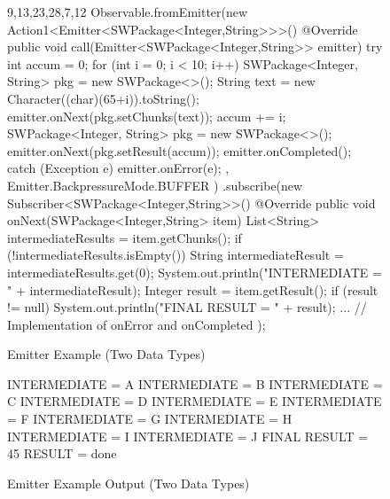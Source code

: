 \begin{figure}[H]
\begin{minipage}{0.65\textwidth}
\begin{sourcecode}
\begin{javacode}{9,13,23,28,7,12}
Observable.fromEmitter(new Action1<Emitter<SWPackage<Integer,String>>>() {
    @Override
    public void call(Emitter<SWPackage<Integer,String>> emitter) {
        try {
            int accum = 0;
            for (int i = 0; i < 10; i++) {
                SWPackage<Integer, String> pkg = new SWPackage<>();
                String text = new Character((char)(65+i)).toString();
                emitter.onNext(pkg.setChunks(text));
                accum += i;
            }
            SWPackage<Integer, String> pkg = new SWPackage<>();
            emitter.onNext(pkg.setResult(accum));
            emitter.onCompleted();
        } catch (Exception e) {
            emitter.onError(e);
        }
    }
}, Emitter.BackpressureMode.BUFFER )
.subscribe(new Subscriber<SWPackage<Integer,String>>() {
    @Override
    public void onNext(SWPackage<Integer,String> item) {
        List<String> intermediateResults = item.getChunks();
        if (!intermediateResults.isEmpty()) {
            String intermediateResult = intermediateResults.get(0);
            System.out.println("INTERMEDIATE = " + intermediateResult);
        }
        Integer result = item.getResult();
        if (result != null) {
            System.out.println("FINAL RESULT = " + result);
        }
    }
	... // Implementation of onError and onCompleted
});
\end{javacode}
\caption{Emitter Example (Two Data Types)}
\label{code:emitter-two-types-example}
\end{sourcecode}
\end{minipage}\hspace{0.7cm}
\begin{minipage}{0.30\textwidth}
\begin{sourcecode}
\begin{javacode}{}
INTERMEDIATE = A
INTERMEDIATE = B
INTERMEDIATE = C
INTERMEDIATE = D
INTERMEDIATE = E
INTERMEDIATE = F
INTERMEDIATE = G
INTERMEDIATE = H
INTERMEDIATE = I
INTERMEDIATE = J
FINAL RESULT = 45
RESULT = done
\end{javacode}
\caption{Emitter Example Output (Two Data Types)}
\label{code:emitter-two-types-output}
\end{sourcecode}
\end{minipage}
\end{figure}